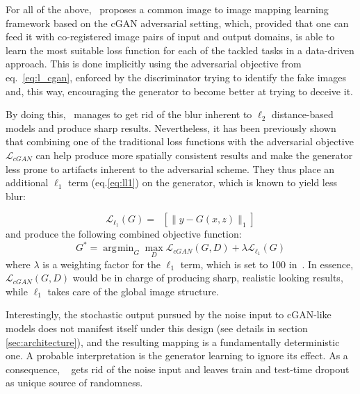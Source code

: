 \documentclass{bmvc2k}
\DeclareMathOperator*{\argmin}{\arg\!\min}
\begin{document}
For all of the above,~\cite{pix2pix2016} proposes a common image to image mapping learning framework based on the cGAN adversarial setting, which, provided that one can feed it with co-registered image pairs of input and output domains, is able to learn the most suitable loss function for each of the tackled tasks in a data-driven approach. This is done implicitly using the adversarial objective from eq.~\ref{eq:l_cgan}, enforced by the discriminator trying to identify the fake images and, this way, encouraging the generator to become better at trying to deceive it. 

By doing this,~\cite{pix2pix2016} manages to get rid of the blur inherent to $\ell_2$ distance-based models and produce sharp results.
Nevertheless, it has been previously shown~\cite{Pathak_2016_CVPR, shrivastava_learning_2016} that combining one of the traditional loss functions with the adversarial objective $\mathcal{L}_{cGAN}$ can help produce more spatially consistent results and make the generator less prone to artifacts inherent to the adversarial scheme.
They thus place an additional $\ell_1$ term (eq.\ref{eq:ll1}) on the generator, which is known to yield less blur:

\begin{equation} \label{eq:ll1}
\mathcal{L}_{\ell_1}(G) = \mathop{\mathbb{E}_{x,y\sim p_{data}(x,y),z\sim p_{noise}(z)}} [\|y-G(x,z)\|_1]
\end{equation}
and produce the following combined objective function:
\begin{equation} \label{eq:minmax_lgan_lone}
G^* = \argmin_{G} \max_{D} \mathcal{L}_{cGAN}(G,D) + \lambda\mathcal{L}_{\ell_1}(G)
\end{equation}
where $\lambda$ is a weighting factor for the $\ell_1$ term, which is set to 100 in~\cite{pix2pix2016}. 
In essence, $\mathcal{L}_{cGAN}(G,D)$ would be in charge of producing sharp, realistic looking results, while $\ell_1$ takes care of the global image structure.

Interestingly, the stochastic output pursued by the noise input to cGAN-like models does not manifest itself under this design (see details in section \ref{sec:architecture}), and the resulting mapping is a fundamentally deterministic one.
A probable interpretation is the generator learning to ignore its effect. 
As a consequence, ~\cite{pix2pix2016} gets rid of the noise input and leaves train and test-time dropout as unique source of randomness.
\end{document}
